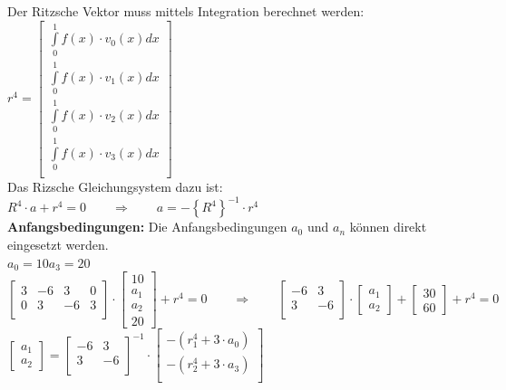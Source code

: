 Der Ritzsche Vektor muss mittels Integration berechnet werden:\\

$r^4=
\begin{bmatrix}
	\int\limits_{0}^{1}{f(x)\cdot v_0(x)dx}\\
	\int\limits_{0}^{1}{f(x)\cdot v_1(x)dx}\\
	\int\limits_{0}^{1}{f(x)\cdot v_2(x)dx}\\
	\int\limits_{0}^{1}{f(x)\cdot v_3(x)dx}\\
\end{bmatrix}$\\

Das Rizsche Gleichungsystem dazu ist: $\boxed{R^4\cdot a+r^4=0} \qquad\Rightarrow\qquad a=-\left\{R^4\right\}^{-1}\cdot r^4$\\

\textbf{Anfangsbedingungen:} Die Anfangsbedingungen $a_0$ und $a_n$ können direkt eingesetzt werden.\\

$a_0=10$\qquad$a_3=20$\\

$
	\begin{bmatrix}
		3 & -6 & 3 & 0 \\
		0 & 3 & -6 & 3 \\
	\end{bmatrix}\cdot
	\begin{bmatrix}
		10\\a_1\\a_2\\20
	\end{bmatrix}+r^4=0\qquad\Rightarrow\qquad
	\begin{bmatrix}
		-6 & 3 \\
		 3 & -6 \\
	\end{bmatrix}\cdot
	\begin{bmatrix}
		a_1\\a_2
	\end{bmatrix}+
	\begin{bmatrix}
		30\\60
	\end{bmatrix}+
	r^4=0
$\\

$
	\begin{bmatrix}
			a_1\\a_2
	\end{bmatrix}=
	\begin{bmatrix}
		-6 & 3 \\
	 	 3 & -6 \\
	\end{bmatrix}^{-1}\cdot
	\begin{bmatrix}
		-\left(r^4_1+3\cdot a_0\right)\\
		-\left(r^4_2+3\cdot a_3\right)\\
	\end{bmatrix}		
$

